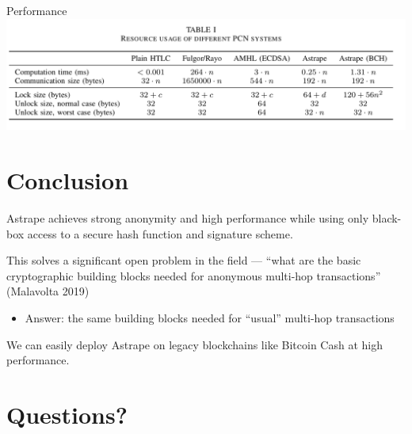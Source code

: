\documentclass[aspectratio=169]{beamer}
\begin{document}
\begin{frame}{Performance}
    \includegraphics[width=\textwidth]{table.png}
\end{frame}

\section{Conclusion}

\begin{frame}
    Astrape achieves strong anonymity and high performance while using only black-box access to a secure hash function and signature scheme.

    This solves a significant open problem in the field --- ``what are the basic cryptographic building blocks needed for anonymous multi-hop transactions'' (Malavolta 2019)
    \begin{itemize}
        \item Answer: the same building blocks needed for ``usual'' multi-hop transactions
    \end{itemize}

    We can easily deploy Astrape on legacy blockchains like Bitcoin Cash at high performance.
\end{frame}

\section{Questions?}
\end{document}
